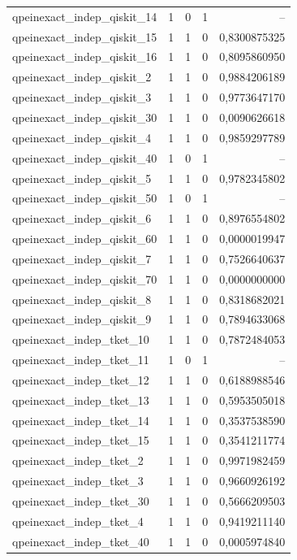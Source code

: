 \begin{longtable}{lrrrr}
qpeinexact\_indep\_qiskit\_14 & 1 & 0 & 1 & -- \\
qpeinexact\_indep\_qiskit\_15 & 1 & 1 & 0 & 0,8300875325 \\
qpeinexact\_indep\_qiskit\_16 & 1 & 1 & 0 & 0,8095860950 \\
qpeinexact\_indep\_qiskit\_2 & 1 & 1 & 0 & 0,9884206189 \\
qpeinexact\_indep\_qiskit\_3 & 1 & 1 & 0 & 0,9773647170 \\
qpeinexact\_indep\_qiskit\_30 & 1 & 1 & 0 & 0,0090626618 \\
qpeinexact\_indep\_qiskit\_4 & 1 & 1 & 0 & 0,9859297789 \\
qpeinexact\_indep\_qiskit\_40 & 1 & 0 & 1 & -- \\
qpeinexact\_indep\_qiskit\_5 & 1 & 1 & 0 & 0,9782345802 \\
qpeinexact\_indep\_qiskit\_50 & 1 & 0 & 1 & -- \\
qpeinexact\_indep\_qiskit\_6 & 1 & 1 & 0 & 0,8976554802 \\
qpeinexact\_indep\_qiskit\_60 & 1 & 1 & 0 & 0,0000019947 \\
qpeinexact\_indep\_qiskit\_7 & 1 & 1 & 0 & 0,7526640637 \\
qpeinexact\_indep\_qiskit\_70 & 1 & 1 & 0 & 0,0000000000 \\
qpeinexact\_indep\_qiskit\_8 & 1 & 1 & 0 & 0,8318682021 \\
qpeinexact\_indep\_qiskit\_9 & 1 & 1 & 0 & 0,7894633068 \\
qpeinexact\_indep\_tket\_10 & 1 & 1 & 0 & 0,7872484053 \\
qpeinexact\_indep\_tket\_11 & 1 & 0 & 1 & -- \\
qpeinexact\_indep\_tket\_12 & 1 & 1 & 0 & 0,6188988546 \\
qpeinexact\_indep\_tket\_13 & 1 & 1 & 0 & 0,5953505018 \\
qpeinexact\_indep\_tket\_14 & 1 & 1 & 0 & 0,3537538590 \\
qpeinexact\_indep\_tket\_15 & 1 & 1 & 0 & 0,3541211774 \\
qpeinexact\_indep\_tket\_2 & 1 & 1 & 0 & 0,9971982459 \\
qpeinexact\_indep\_tket\_3 & 1 & 1 & 0 & 0,9660926192 \\
qpeinexact\_indep\_tket\_30 & 1 & 1 & 0 & 0,5666209503 \\
qpeinexact\_indep\_tket\_4 & 1 & 1 & 0 & 0,9419211140 \\
qpeinexact\_indep\_tket\_40 & 1 & 1 & 0 & 0,0005974840 \\

\end{longtable}
